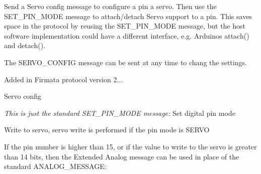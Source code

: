 Send a Servo config message to configure a pin a servo. Then use the {\ttfamily S\+E\+T\+\_\+\+P\+I\+N\+\_\+\+M\+O\+DE} message to attach/detach Servo support to a pin. This saves space in the protocol by reusing the {\ttfamily S\+E\+T\+\_\+\+P\+I\+N\+\_\+\+M\+O\+DE} message, but the host software implementation could have a different interface, e.\+g. Arduino\textquotesingle{}s {\ttfamily attach()} and {\ttfamily detach()}.

The {\ttfamily S\+E\+R\+V\+O\+\_\+\+C\+O\+N\+F\+IG} message can be sent at any time to chang the settings.

Added in Firmata protocol version 2...

Servo config 
\begin{DoxyCode}{0}
\end{DoxyCode}


{\itshape This is just the standard {\ttfamily S\+E\+T\+\_\+\+P\+I\+N\+\_\+\+M\+O\+DE} message\+:} Set digital pin mode 
\begin{DoxyCode}{0}
\end{DoxyCode}


Write to servo, servo write is performed if the pin mode is S\+E\+R\+VO 
\begin{DoxyCode}{0}
\end{DoxyCode}


If the pin number is higher than 15, or if the value to write to the servo is greater than 14 bits, then the Extended Analog message can be used in place of the standard {\ttfamily A\+N\+A\+L\+O\+G\+\_\+\+M\+E\+S\+S\+A\+GE}\+:


\begin{DoxyCode}{0}
\end{DoxyCode}
 